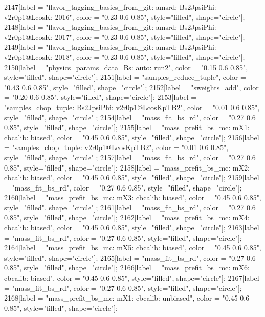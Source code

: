 {	2147[label = "flavor_tagging_basics_from_git\nflavor: amsrd\nmode: Bs2JpsiPhi\nversion: v2r0p1@LcosK\nyear: 2016", color = "0.23 0.6 0.85", style="filled", shape="circle"];
	2148[label = "flavor_tagging_basics_from_git\nflavor: amsrd\nmode: Bs2JpsiPhi\nversion: v2r0p1@LcosK\nyear: 2017", color = "0.23 0.6 0.85", style="filled", shape="circle"];
	2149[label = "flavor_tagging_basics_from_git\nflavor: amsrd\nmode: Bs2JpsiPhi\nversion: v2r0p1@LcosK\nyear: 2018", color = "0.23 0.6 0.85", style="filled", shape="circle"];
	2150[label = "physics_params_data_Bs\nfit: auto\nyear: run2", color = "0.15 0.6 0.85", style="filled", shape="circle"];
	2151[label = "samples_reduce_tuple", color = "0.43 0.6 0.85", style="filled", shape="circle"];
	2152[label = "sweights_add", color = "0.20 0.6 0.85", style="filled", shape="circle"];
	2153[label = "samples_chop_tuple\nmode: Bs2JpsiPhi\nversion: v2r0p1@LcosKpTB2", color = "0.01 0.6 0.85", style="filled", shape="circle"];
	2154[label = "mass_fit_bs_rd", color = "0.27 0.6 0.85", style="filled", shape="circle"];
	2155[label = "mass_prefit_bs_mc\nmassbin: mX1\nmassmodel: cbcalib\ntrigger: biased", color = "0.45 0.6 0.85", style="filled", shape="circle"];
	2156[label = "samples_chop_tuple\nversion: v2r0p1@LcosKpTB2", color = "0.01 0.6 0.85", style="filled", shape="circle"];
	2157[label = "mass_fit_bs_rd", color = "0.27 0.6 0.85", style="filled", shape="circle"];
	2158[label = "mass_prefit_bs_mc\nmassbin: mX2\nmassmodel: cbcalib\ntrigger: biased", color = "0.45 0.6 0.85", style="filled", shape="circle"];
	2159[label = "mass_fit_bs_rd", color = "0.27 0.6 0.85", style="filled", shape="circle"];
	2160[label = "mass_prefit_bs_mc\nmassbin: mX3\nmassmodel: cbcalib\ntrigger: biased", color = "0.45 0.6 0.85", style="filled", shape="circle"];
	2161[label = "mass_fit_bs_rd", color = "0.27 0.6 0.85", style="filled", shape="circle"];
	2162[label = "mass_prefit_bs_mc\nmassbin: mX4\nmassmodel: cbcalib\ntrigger: biased", color = "0.45 0.6 0.85", style="filled", shape="circle"];
	2163[label = "mass_fit_bs_rd", color = "0.27 0.6 0.85", style="filled", shape="circle"];
	2164[label = "mass_prefit_bs_mc\nmassbin: mX5\nmassmodel: cbcalib\ntrigger: biased", color = "0.45 0.6 0.85", style="filled", shape="circle"];
	2165[label = "mass_fit_bs_rd", color = "0.27 0.6 0.85", style="filled", shape="circle"];
	2166[label = "mass_prefit_bs_mc\nmassbin: mX6\nmassmodel: cbcalib\ntrigger: biased", color = "0.45 0.6 0.85", style="filled", shape="circle"];
	2167[label = "mass_fit_bs_rd", color = "0.27 0.6 0.85", style="filled", shape="circle"];
	2168[label = "mass_prefit_bs_mc\nmassbin: mX1\nmassmodel: cbcalib\ntrigger: unbiased", color = "0.45 0.6 0.85", style="filled", shape="circle"];
}
